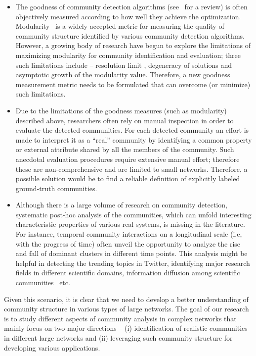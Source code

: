 \begin{itemize}

\item  The goodness of community detection algorithms (see~\cite{Fortunato:2009} for a review) is often objectively measured according to
how well they achieve the optimization. Modularity~\cite{ng2002} is a widely accepted metric for measuring the quality of community
structure identified by various community detection algorithms. However, a growing body of research have begun to explore the limitations of
maximizing modularity for community identification and evaluation; three such limitations include -- resolution limit \cite{gmc2010},
degeneracy of solutions and asymptotic growth of the modularity value.
Therefore, a new goodness measurement metric needs to be formulated that can overcome (or minimize) such limitations.
 
\item Due to the limitations of the goodness measures (such as modularity) described above, researchers often rely on manual inspection in
order
to evaluate the detected communities. For each detected community an
effort is made to interpret it as a ``real'' community by identifying a common property or external attribute shared by all the members of
the community. Such anecdotal evaluation procedures require extensive manual effort; therefore these are non-comprehensive and are limited
to small networks.
Therefore, a possible solution would be to find a reliable definition of explicitly labeled ground-truth communities.

\item Although there is a large volume of research on community detection, systematic post-hoc analysis of the communities, which can
unfold interesting characteristic properties of various real systems, is missing in the literature. For instance, temporal community
interactions on a longitudinal scale (i.e, with the progress of time)  often unveil the opportunity to analyze the rise and fall of
dominant clusters in
different time points. This analysis might be helpful in detecting the trending topics in Twitter, identifying major research
fields in different scientific domains, information diffusion among scientific communities~\cite{Shi} etc.     
\end{itemize}

Given this scenario, it is clear that we need to develop a better understanding of community structure in various types of large networks.
The goal of our research is to study different aspects of community analysis in complex networks that mainly focus on two major directions
-- (i) identification of realistic communities in different large networks and (ii) leveraging such community structure for developing
various
applications. 


